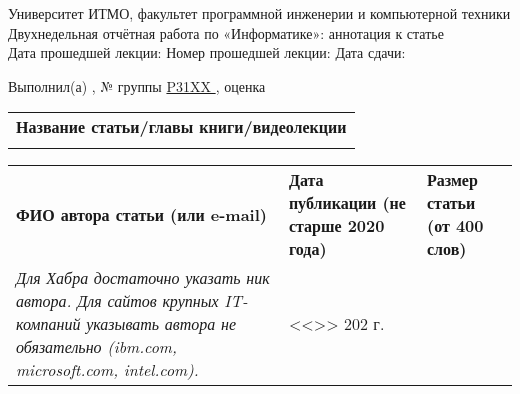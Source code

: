 \documentclass[12pt]{article}
\begin{document}
\begin{center}
\quad Университет ИТМО, факультет программной инженерии и компьютерной техники \\
\quad Двухнедельная отчётная работа по «Информатике»: аннотация к статье\\
\quad Дата прошедшей лекции: \underline{\hspace{2.3cm}} 	Номер прошедшей лекции: \underline{\hspace{0.8cm}}	Дата сдачи: \underline{\hspace{2.3cm}}

\bigskip

\quad Выполнил(а) \underline{\hspace{5cm}}, № группы \underline{ P31XX }, оценка \underline{\hspace{2cm}}


\end{center}

\begin{tabularx}{\textwidth} { 
  | >{\raggedright\arraybackslash}X|}
    \hline
\textbf{Название статьи/главы книги/видеолекции}\\
    \\
    \hline
\end{tabularx}

\begin{tabularx}{\textwidth} 
{ 
| >{\centering\arraybackslash}X
| >{\centering\arraybackslash}X
| >{\centering\arraybackslash}X 
|}
    \textbf{ФИО автора статьи \quad (или e-mail)} & \textbf{Дата публикации \qquad\qquad (не старше 2020 года)} & \textbf{Размер статьи \qquad\qquad (от 400 слов)} \\
     \textit{Для Хабра достаточно указать ник автора. Для сайтов крупных IT-компаний указывать автора не обязательно (ibm.com, microsoft.com, intel.com).} & <<\underline{\hspace{0.5cm}}>> \underline{\hspace{1.5cm}} 202\underline{\hspace{0.2cm}} г. & \underline{\hspace{2.5cm}} \\
    \hline
\end{tabularx}
\end{document}

